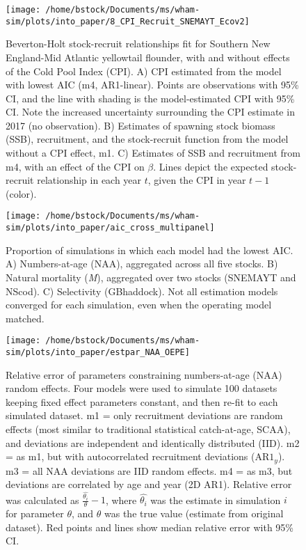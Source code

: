 \documentclass[]{article}
\begin{document}
\pagebreak

\begin{figure}

{\centering \texttt{[image: /home/bstock/Documents/ms/wham-sim/plots/into\_paper/8\_CPI\_Recruit\_SNEMAYT\_Ecov2]} 

}

\caption{Beverton-Holt stock-recruit relationships fit for Southern New England-Mid Atlantic yellowtail flounder, with and without effects of the Cold Pool Index (CPI). A) CPI estimated from the model with lowest AIC (m4, AR1-linear). Points are observations with 95\% CI, and the line with shading is the model-estimated CPI with 95\% CI. Note the increased uncertainty surrounding the CPI estimate in 2017 (no observation). B) Estimates of spawning stock biomass (SSB), recruitment, and the stock-recruit function from the model without a CPI effect, m1. C) Estimates of SSB and recruitment from m4, with an effect of the CPI on $\beta$. Lines depict the expected stock-recruit relationship in each year $t$, given the CPI in year $t-1$ (color).}\label{fig:devs-SNEMAYT-ecov}
\end{figure}

\pagebreak

\begin{figure}

{\centering \texttt{[image: /home/bstock/Documents/ms/wham-sim/plots/into\_paper/aic\_cross\_multipanel]} 

}

\caption{Proportion of simulations in which each model had the lowest AIC. A) Numbers-at-age (NAA), aggregated across all five stocks. B) Natural mortality (\textit{M}), aggregated over two stocks (SNEMAYT and NScod). C) Selectivity (GBhaddock). Not all estimation models converged for each simulation, even when the operating model matched.}\label{fig:aic-cross}
\end{figure}

\pagebreak

\begin{figure}

{\centering \texttt{[image: /home/bstock/Documents/ms/wham-sim/plots/into\_paper/estpar\_NAA\_OEPE]} 

}

\caption{Relative error of parameters constraining numbers-at-age (NAA) random effects. Four models were used to simulate 100 datasets keeping fixed effect parameters constant, and then re-fit to each simulated dataset. m1 = only recruitment deviations are random effects (most similar to traditional statistical catch-at-age, SCAA), and deviations are independent and identically distributed (IID). m2 = as m1, but with autocorrelated recruitment deviations ($\text{AR1}_y$). m3 = all NAA deviations are IID random effects. m4 = as m3, but deviations are correlated by age and year (2D AR1). Relative error was calculated as $\frac{\hat{\theta_i}}{\theta} - 1$, where $\hat{\theta_i}$ was the estimate in simulation $i$ for parameter $\theta$, and $\theta$ was the true value (estimate from original dataset). Red points and lines show median relative error with 95\% CI.}\label{fig:estpar-naa}
\end{figure}
\end{document}
